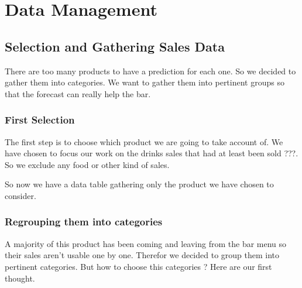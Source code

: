 \documentclass{report}
\begin{document}
\chapter{Data Management}

\section{Selection and Gathering Sales Data}

There are too many products to have a prediction for each one. So we decided to gather them into categories. We want to gather them into pertinent groups so that the forecast can really help the bar. 

\subsection{First Selection}

The first step is to choose which product we are going to take account of. We have chosen to focus our work on the drinks sales that had at least been sold ???. So we exclude any food or other kind of sales. 

So now we have a data table gathering only the product we have chosen to consider.

\subsection{Regrouping them into categories}

A majority of this product has been coming and leaving from the bar menu so their sales aren't usable one by one. Therefor we decided to group them into pertinent categories. But how to choose this categories ? Here are our first thought.
\end{document}
